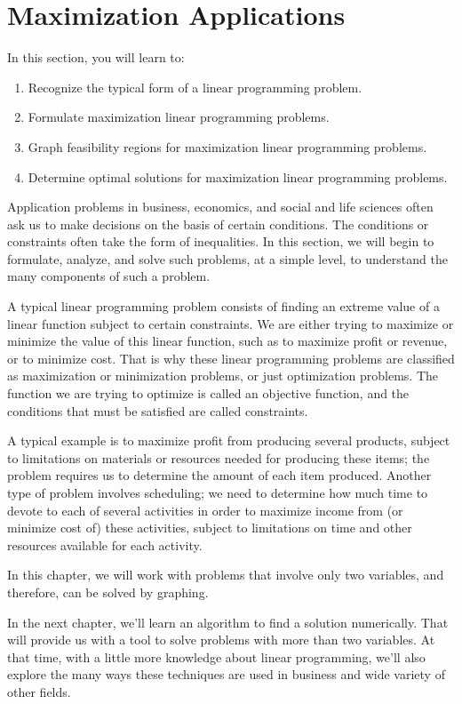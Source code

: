 \section{Maximization Applications}

In this section, you will learn to:
\begin{enumerate}
    \item Recognize the typical form of a linear programming problem.
    \item Formulate maximization linear programming problems.
    \item Graph feasibility regions for maximization linear programming problems.
    \item Determine optimal solutions for maximization linear programming problems.
\end{enumerate}

Application problems in business, economics, and social and life sciences often ask us to make decisions on the basis of certain conditions.  The conditions or constraints  often take the form of inequalities.  In this section, we will begin to formulate, analyze, and solve such problems, at a simple level, to understand the many components of such a problem.

A typical linear programming problem consists of finding an extreme value of a linear function subject to certain constraints.  We are either trying to maximize or minimize the value of this linear function, such as to maximize profit or revenue, or to minimize cost.  That is why these linear programming problems are classified as maximization or minimization problems, or just optimization problems.  The function we are trying to optimize is called an objective function, and the conditions that must be satisfied are called constraints.

A typical example is to maximize profit from producing several products, subject to limitations on materials or resources needed for producing these items; the problem requires us to determine the amount of each item produced.  Another type of problem involves scheduling; we need to determine how much time to devote to each of several activities in order to maximize income from (or minimize cost of) these activities, subject to limitations on time and other resources available for each activity.

In this chapter, we will work with problems that involve only two variables, and therefore, can be solved by graphing.

In the next chapter, we’ll learn an algorithm to find a solution numerically.  That will provide us with a tool to solve problems with more than two variables. At that time, with a little more knowledge about linear programming, we’ll also explore the many ways these techniques are used in business and wide variety of other fields.

